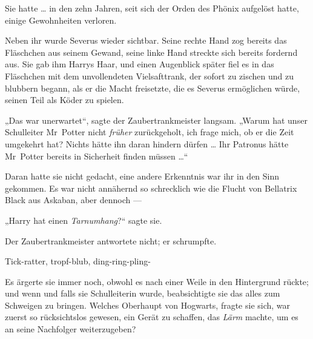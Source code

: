 Sie hatte … in den zehn Jahren, seit sich der Orden des Phönix aufgelöst hatte, einige Gewohnheiten verloren.

Neben ihr wurde Severus wieder sichtbar. Seine rechte Hand zog bereits das Fläschchen aus seinem Gewand, seine linke Hand streckte sich bereits fordernd aus. Sie gab ihm Harrys Haar, und einen Augenblick später fiel es in das Fläschchen mit dem unvollendeten Vielsafttrank, der sofort zu zischen und zu blubbern begann, als er die Macht freisetzte, die es Severus ermöglichen würde, seinen Teil als Köder zu spielen.

„Das war unerwartet“, sagte der Zaubertrankmeister langsam.
„Warum hat unser Schulleiter Mr~Potter nicht \emph{früher} zurückgeholt, ich frage mich, ob er die Zeit umgekehrt hat? Nichts hätte ihn daran hindern dürfen … Ihr Patronus hätte Mr~Potter bereits in Sicherheit finden müssen …“

Daran hatte sie nicht gedacht, eine andere Erkenntnis war ihr in den Sinn gekommen. Es war nicht annähernd so schrecklich wie die Flucht von Bellatrix Black aus Askaban, aber dennoch —

„Harry hat einen \emph{Tarnumhang}?“ sagte sie.

Der Zaubertrankmeister antwortete nicht; er schrumpfte.

\later

Tick-ratter, tropf-blub, ding-ring-pling-

Es ärgerte sie immer noch, obwohl es nach einer Weile in den Hintergrund rückte; und wenn und falls sie Schulleiterin wurde, beabsichtigte sie das alles zum Schweigen zu bringen. Welches Oberhaupt von Hogwarts, fragte sie sich, war zuerst so rücksichtslos gewesen, ein Gerät zu schaffen, das \emph{Lärm} machte, um es an seine Nachfolger weiterzugeben?

